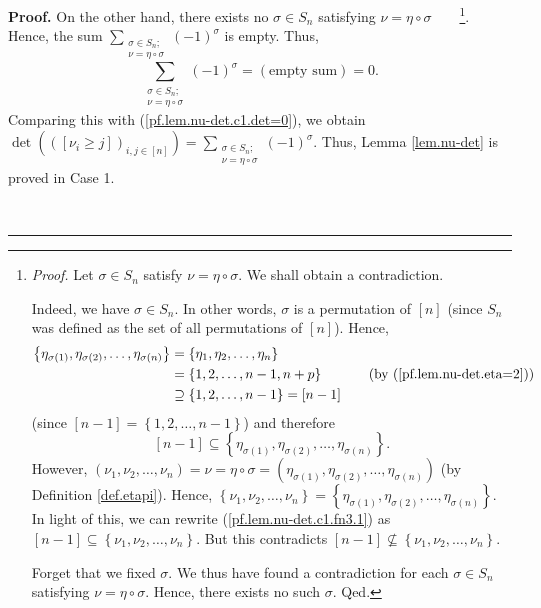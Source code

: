 \documentclass
[numbers=enddot,12pt,final,onecolumn,notitlepage,english]{scrartcl}%
\theoremstyle{definition}
\newenvironment{proof}[1][Proof]{\noindent\textbf{#1.} }{\ \rule{0.5em}{0.5em}}
\let\sumnonlimits\sum
\renewcommand{\sum}{\sumnonlimits\limits}
\newenvironment{verlong}{}{}
\begin{document}
\begin{proof}
\begin{verlong}
On the other hand, there exists no $\sigma\in S_{n}$ satisfying $\nu=\eta
\circ\sigma$\ \ \ \ \footnote{\textit{Proof.} Let $\sigma\in S_{n}$ satisfy
$\nu=\eta\circ\sigma$. We shall obtain a contradiction.
\par
Indeed, we have $\sigma\in S_{n}$. In other words, $\sigma$ is a permutation
of $\left[  n\right]  $ (since $S_{n}$ was defined as the set of all
permutations of $\left[  n\right]  $). Hence,
\begin{align*}
\left\{  \eta_{\sigma\left(  1\right)  },\eta_{\sigma\left(  2\right)
},\ldots,\eta_{\sigma\left(  n\right)  }\right\}   &  =\left\{  \eta_{1}%
,\eta_{2},\ldots,\eta_{n}\right\} \\
&  =\left\{  1,2,\ldots,n-1,n+p\right\}  \ \ \ \ \ \ \ \ \ \ \left(  \text{by
(\ref{pf.lem.nu-det.eta=2})}\right) \\
&  \supseteq\left\{  1,2,\ldots,n-1\right\}  =\left[  n-1\right]
\end{align*}
(since $\left[  n-1\right]  =\left\{  1,2,\ldots,n-1\right\}  $) and therefore%
\begin{equation}
\left[  n-1\right]  \subseteq\left\{  \eta_{\sigma\left(  1\right)  }%
,\eta_{\sigma\left(  2\right)  },\ldots,\eta_{\sigma\left(  n\right)
}\right\}  . \label{pf.lem.nu-det.c1.fn3.1}%
\end{equation}
However, $\left(  \nu_{1},\nu_{2},\ldots,\nu_{n}\right)  =\nu=\eta\circ
\sigma=\left(  \eta_{\sigma\left(  1\right)  },\eta_{\sigma\left(  2\right)
},\ldots,\eta_{\sigma\left(  n\right)  }\right)  $ (by Definition
\ref{def.etapi}). Hence, $\left\{  \nu_{1},\nu_{2},\ldots,\nu_{n}\right\}
=\left\{  \eta_{\sigma\left(  1\right)  },\eta_{\sigma\left(  2\right)
},\ldots,\eta_{\sigma\left(  n\right)  }\right\}  $. In light of this, we can
rewrite (\ref{pf.lem.nu-det.c1.fn3.1}) as $\left[  n-1\right]  \subseteq
\left\{  \nu_{1},\nu_{2},\ldots,\nu_{n}\right\}  $. But this contradicts
$\left[  n-1\right]  \not \subseteq \left\{  \nu_{1},\nu_{2},\ldots,\nu
_{n}\right\}  $.
\par
Forget that we fixed $\sigma$. We thus have found a contradiction for each
$\sigma\in S_{n}$ satisfying $\nu=\eta\circ\sigma$. Hence, there exists no
such $\sigma$. Qed.}. Hence, the sum $\sum_{\substack{\sigma\in S_{n}%
;\\\nu=\eta\circ\sigma}}\left(  -1\right)  ^{\sigma}$ is empty. Thus,%
\[
\sum_{\substack{\sigma\in S_{n};\\\nu=\eta\circ\sigma}}\left(  -1\right)
^{\sigma}=\left(  \text{empty sum}\right)  =0.
\]
Comparing this with (\ref{pf.lem.nu-det.c1.det=0}), we obtain $\det\left(
\left(  \left[  \nu_{i}\geq j\right]  \right)  _{i,j\in\left[  n\right]
}\right)  =\sum_{\substack{\sigma\in S_{n};\\\nu=\eta\circ\sigma}}\left(
-1\right)  ^{\sigma}$. Thus, Lemma \ref{lem.nu-det} is proved in Case 1.
\medskip
\end{verlong}


\end{proof}
\end{document}
